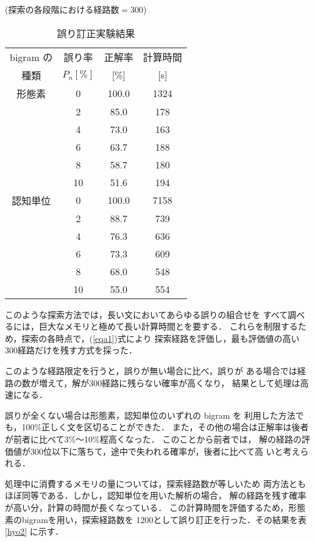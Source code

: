 \begin{table}[h]
\caption{誤り訂正実験結果}\label{hyo1}
\begin{center}
{\small (探索の各段階における経路数$=$300)}\\[3mm]
\begin{tabular}{c|c|cc} \hline \hline
bigram の & 誤り率 & 正解率 & 計算時間 \\
種類 & $P_n[\%]$ & [\%] & [s]\\ \hline \hline
形態素 & 0 & 100.0 & 1324 \\
       & 2 & 85.0 & 178 \\
 & 4 & 73.0 & 163 \\
 & 6 & 63.7 & 188 \\
 & 8 & 58.7 & 180 \\
 & 10 & 51.6 & 194 \\ \hline
 認知単位 & 0 & 100.0 & 7158 \\
 & 2 & 88.7 & 739 \\
 & 4 & 76.3 & 636 \\
 & 6 & 73.3 & 609 \\
 & 8 & 68.0 & 548 \\
 & 10 & 55.0 & 554 \\ \hline \hline
\end{tabular}
\end{center}
\vspace*{-3mm}
\end{table}


このような探索方法では，長い文においてあらゆる誤りの組合せを
すべて調べるには，巨大なメモリと極めて長い計算時間とを要する．
これらを制限するため，探索の各時点で，(\ref{eqa1})式により
探索経路を評価し，最も評価値の高い300経路だけを残す方式を採った．

このような経路限定を行うと，誤りが無い場合に比べ，誤りが
ある場合では経路の数が増えて，解が300経路に残らない確率が高くなり，
結果として処理は高速になる．

誤りが全くない場合は形態素，認知単位のいずれの bigram を
利用した方法でも，100\%正しく文を区切ることができた．
また，その他の場合は正解率は後者が前者に比べて3\%〜10\%程高くなった．
このことから前者では，
解の経路の評価値が300位以下に落ちて，途中で失われる確率が，後者に比べて高
いと考えられる．

処理中に消費するメモリの量については，探索経路数が等しいため
両方法ともほぼ同等である．しかし，認知単位を用いた解析の場合，
解の経路を残す確率が高い分，計算の時間が長くなっている．
この計算時間を評価するため，形態素のbigramを用い，探索経路数を
1200として誤り訂正を行った．その結果を表\ref{hyo2} に示す．

